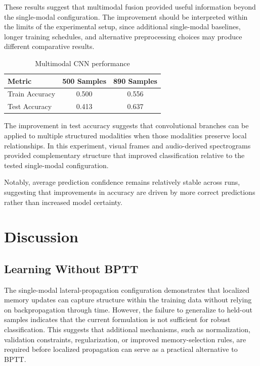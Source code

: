 \documentclass[lineno]{wlpeerj}
\begin{document}
These results suggest that multimodal fusion provided useful information beyond the single-modal configuration. The improvement should be interpreted within the limits of the experimental setup, since additional single-modal baselines, longer training schedules, and alternative preprocessing choices may produce different comparative results.
	
	\begin{table}[h]
		\centering
		\begin{tabular}{lcc}
			\toprule
			Metric & 500 Samples & 890 Samples \\
			\midrule
			Train Accuracy & 0.500 & 0.556 \\
			Test Accuracy & 0.413 & 0.637 \\
			\bottomrule
		\end{tabular}
		\caption{Multimodal CNN performance}
	\end{table}
	
The improvement in test accuracy suggests that convolutional branches can be applied to multiple structured modalities when those modalities preserve local relationships. In this experiment, visual frames and audio-derived spectrograms provided complementary structure that improved classification relative to the tested single-modal configuration.
	
	Notably, average prediction confidence remains relatively stable across runs, suggesting that improvements in accuracy are driven by more correct predictions rather than increased model certainty.
\section{Discussion}

\subsection{Learning Without BPTT}

The single-modal lateral-propagation configuration demonstrates that localized memory updates can capture structure within the training data without relying on backpropagation through time. However, the failure to generalize to held-out samples indicates that the current formulation is not sufficient for robust classification. This suggests that additional mechanisms, such as normalization, validation constraints, regularization, or improved memory-selection rules, are required before localized propagation can serve as a practical alternative to BPTT.
\end{document}

